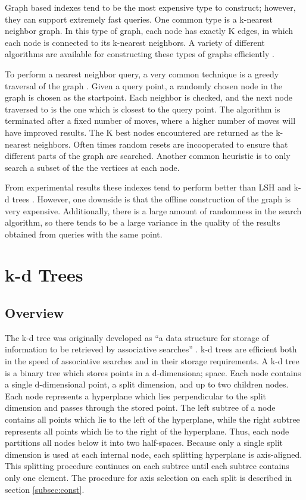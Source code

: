 Graph based indexes tend to be the most expensive type to construct; however, they can support extremely fast queries.  One common type is a k-nearest neighbor graph.  In this type of graph, each node has exactly K edges, in which each node is connected to its k-nearest neighbors.  A variety of different algorithms are available for constructing these types of graphs efficiently \citep{connor2010fast}.

To perform a nearest neighbor query, a very common technique is a greedy traversal of the graph \citep{hajebi2011fast}.  Given a query point, a randomly chosen node in the graph is chosen as the startpoint.  Each neighbor is checked, and the next node traversed to is the one which is closest to the query point.  The algorithm is terminated after a fixed number of moves, where a higher number of moves will have improved results.  The K best nodes encountered are returned as the k-nearest neighbors.  Often times random resets are incooperated to ensure that different parts of the graph are searched.  Another common heuristic is to only search a subset of the the vertices at each node.

From experimental results these indexes tend to perform better than LSH and k-d trees \citep{hajebi2011fast}.  However, one downside is that the offline construction of the graph is very expensive.  Additionally, there is a large amount of randomness in the search algorithm, so there tends to be a large variance in the quality of the results obtained from queries with the same point.

\section{k-d Trees}
\label{sec:kdtree}

\subsection{Overview}
The k-d tree was originally developed as ``a data structure for storage of information to be retrieved by associative searches'' \citep{bentley1975multidimensional}. k-d trees are efficient both in the speed of associative searches and in their storage requirements.  A k-d tree is a binary tree which stores points in a d-dimensiona; space.  Each node contains a single d-dimensional point, a split dimension, and up to two children nodes.  Each node represents a hyperplane which lies perpendicular to the split dimension and passes through the stored point.  The left subtree of a node contains all points which lie to the left of the hyperplane, while the right subtree represents all points which lie to the right of the hyperplane.  Thus, each node partitions all nodes below it into two half-spaces.  Because only a single split dimension is used at each internal node, each splitting hyperplane is axis-aligned.  This splitting procedure continues on each subtree until each subtree contains only one element.  The procedure for axis selection on each split is described in section \ref{subsec:const}.

